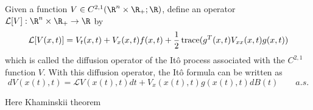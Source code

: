 Given a function 
$
	V\in C^{2,1}(\R^n\times\R_{+};\R)
$, 
define an operator 
$
	\mathcal{L}[V]:\R ^ n \times \R_{+}\to\R
$ by
\begin{equation}\label{eqn::DifussionOperator}
	\mathcal{L}[V(x,t)] = 
		V_t(x,t) + 
		V_x(x,t) f(x,t) + 
		\frac{1}{2} 
		\operatorname{trace}(g^T(x,t)V_{xx}(x,t)g(x,t))
\end{equation}
%
which is called the diffusion operator of the It\^{o} process associated with 
the $C^{2,1}$ function $V$. With this diffusion operator, the It\^{o} formula 
can be written as
\begin{equation}\label{eqn::Itoformula}
	dV(x(t),t) = 
		\mathcal{L}
			V(x(t),t)dt + 
			V_x(x(t), t) 
			g(x(t),t) dB(t) \qquad a.s.
\end{equation}
\begin{theorem}
Here Khaminskii theorem
\end{theorem}